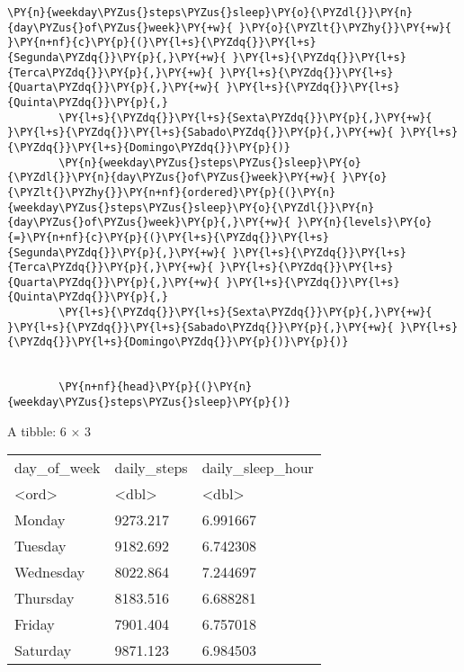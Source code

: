 \begin{tcolorbox}[breakable, size=fbox, boxrule=1pt, pad at break*=1mm,colback=cellbackground, colframe=cellborder]
\begin{Verbatim}[commandchars=\\\{\}]
        \PY{n}{weekday\PYZus{}steps\PYZus{}sleep}\PY{o}{\PYZdl{}}\PY{n}{day\PYZus{}of\PYZus{}week}\PY{+w}{ }\PY{o}{\PYZlt{}\PYZhy{}}\PY{+w}{ }\PY{n+nf}{c}\PY{p}{(}\PY{l+s}{\PYZdq{}}\PY{l+s}{Segunda\PYZdq{}}\PY{p}{,}\PY{+w}{ }\PY{l+s}{\PYZdq{}}\PY{l+s}{Terca\PYZdq{}}\PY{p}{,}\PY{+w}{ }\PY{l+s}{\PYZdq{}}\PY{l+s}{Quarta\PYZdq{}}\PY{p}{,}\PY{+w}{ }\PY{l+s}{\PYZdq{}}\PY{l+s}{Quinta\PYZdq{}}\PY{p}{,}
        \PY{l+s}{\PYZdq{}}\PY{l+s}{Sexta\PYZdq{}}\PY{p}{,}\PY{+w}{ }\PY{l+s}{\PYZdq{}}\PY{l+s}{Sabado\PYZdq{}}\PY{p}{,}\PY{+w}{ }\PY{l+s}{\PYZdq{}}\PY{l+s}{Domingo\PYZdq{}}\PY{p}{)}
        \PY{n}{weekday\PYZus{}steps\PYZus{}sleep}\PY{o}{\PYZdl{}}\PY{n}{day\PYZus{}of\PYZus{}week}\PY{+w}{ }\PY{o}{\PYZlt{}\PYZhy{}}\PY{n+nf}{ordered}\PY{p}{(}\PY{n}{weekday\PYZus{}steps\PYZus{}sleep}\PY{o}{\PYZdl{}}\PY{n}{day\PYZus{}of\PYZus{}week}\PY{p}{,}\PY{+w}{ }\PY{n}{levels}\PY{o}{=}\PY{n+nf}{c}\PY{p}{(}\PY{l+s}{\PYZdq{}}\PY{l+s}{Segunda\PYZdq{}}\PY{p}{,}\PY{+w}{ }\PY{l+s}{\PYZdq{}}\PY{l+s}{Terca\PYZdq{}}\PY{p}{,}\PY{+w}{ }\PY{l+s}{\PYZdq{}}\PY{l+s}{Quarta\PYZdq{}}\PY{p}{,}\PY{+w}{ }\PY{l+s}{\PYZdq{}}\PY{l+s}{Quinta\PYZdq{}}\PY{p}{,}
        \PY{l+s}{\PYZdq{}}\PY{l+s}{Sexta\PYZdq{}}\PY{p}{,}\PY{+w}{ }\PY{l+s}{\PYZdq{}}\PY{l+s}{Sabado\PYZdq{}}\PY{p}{,}\PY{+w}{ }\PY{l+s}{\PYZdq{}}\PY{l+s}{Domingo\PYZdq{}}\PY{p}{)}\PY{p}{)}


        \PY{n+nf}{head}\PY{p}{(}\PY{n}{weekday\PYZus{}steps\PYZus{}sleep}\PY{p}{)}
    \end{Verbatim}
\end{tcolorbox}

A tibble: 6 × 3
\begin{tabular}{lll}
    day\_of\_week & daily\_steps & daily\_sleep\_hour \\
    <ord>         & <dbl>        & <dbl>              \\
    \hline
    Monday        & 9273.217     & 6.991667           \\
    Tuesday       & 9182.692     & 6.742308           \\
    Wednesday     & 8022.864     & 7.244697           \\
    Thursday      & 8183.516     & 6.688281           \\
    Friday        & 7901.404     & 6.757018           \\
    Saturday      & 9871.123     & 6.984503           \\
\end{tabular}



